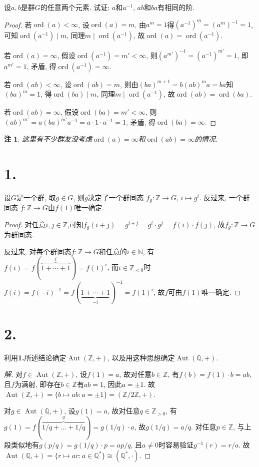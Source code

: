 \documentclass[12pt, a4paper, fontset=windows]{ctexart}
\newcommand{\N}{\mathbb{N}}
\newcommand{\Q}{\mathbb{Q}}
\newcommand{\Z}{\mathbb{Z}}
\newcommand{\Aut}{\operatorname{Aut}}
\newcommand{\isom}{\cong} %
\newcommand{\ord}{\operatorname{ord}}
\newtheorem*{remark}{注}
\newenvironment{solution}{\begin{proof}[解]}{\end{proof}}
\begin{document}
设$a,b$是群$G$的任意两个元素. 试证: $a$和$a^{-1}$, $ab$和$ba$有相同的阶. 

\begin{proof}
若$\ord(a)<\infty$, 设$\ord(a)=m$. 由$a^m=1$得$(a^{-1})^m=(a^m)^{-1}=1$, 
可知$\ord(a^{-1})\mid m$, 同理$m\mid\ord(a^{-1})$, 
故$\ord(a)=\ord(a^{-1})$. 

若$\ord(a)=\infty$, 假设$\ord(a^{-1})=m'<\infty$, 
则$(a^{m'})^{-1}=(a^{-1})^{m'}=1$, 即$a^{m'}=1$, 矛盾, 得$\ord(a^{-1})=\infty$. 

\vspace{1em}

若$\ord(ab)<\infty$, 设$\ord(ab)=m$, 则由$(ba)^{m+1}=b(ab)^ma=ba$知$(ba)^m=1$, 
得$\ord(ba)\mid m$, 同理$m\mid\ord(a^{-1})$, 故$\ord(ab)=\ord(ba)$. 

若$\ord(ab)=\infty$, 假设$\ord(ba)=m'<\infty$, 
则$(ab)^{m'}=a(ba)^{m'}a^{-1}=a\cdot 1\cdot a^{-1}=1$, 矛盾, 得$\ord(ba)=\infty$. 
\end{proof}

\begin{remark}
这里有不少群友没考虑$\ord(a)=\infty$和$\ord(ab)=\infty$的情况. 
\end{remark}

\section*{1.}
\label{f-with-f(1)}

设$G$是一个群, 取$g\in G$, 则$g$决定了一个群同态
$f_g:\Z\to G$, $i\mapsto g^i$. 反过来, 一个群同态
$f:\Z\to G$由$f(1)$唯一确定. 

\begin{proof}
对任意$i,j\in\Z$,可知$f_g(i+j)=g^{i+j}=g^i\cdot g^j=f(i)\cdot f(j)$, 
故$f_g:\Z\to G$为群同态. 

反过来, 对每个群同态$f:\Z\to G$和任意的$i\in\N$, 
有$f(i)=f(\overbrace{1+\cdots+1}^i)=f(1)^i$, 而$i\in\Z_{<0}$时
$f(i)=f(-i)^{-1}=f(\underbrace{1+\cdots+1}_{-i})^{-1}=f(1)^i$, 
故$f$可由$f(1)$唯一确定. 
\end{proof}

\section*{2.}

利用{\bf 1.}所述结论确定$\Aut(\Z,+)$, 以及用这种思想确定$\Aut(\Q,+)$. 

\begin{solution}
对$f\in\Aut(\Z,+)$, 设$f(1)=a$, 故对任意$b\in\Z$, 有$f(b)=f(1)\cdot b=ab$, 
且$f$为满射, 即存在$b\in\Z$有$ab=1$, 因此$a=\pm 1$. 故$\Aut(\Z,+)=\{b\mapsto ab:a=\pm 1\}=(\Z/2\Z,+)$. 

对$g\in\Aut(\Q,+)$, 设$g(1)=a$, 故对任意$q\in\Z_{>0}$, 有$g(1)=f(\overbrace{1/q+...+1/q}^q)=g(1/q)\cdot a$, 
故$g(1/q)=a/q$. 对任意$p\in\Z$, 与上段类似地有$g(p/q)=g(1/q)\cdot p=ap/q$, 且$a\ne 0$时容易验证$g^{-1}(r)=r/a$. 
故$\Aut(\Q,+)=\{r\mapsto ar:a\in\Q^*\}\isom(\Q^*,\cdot)$. 
\end{solution}
\end{document}

